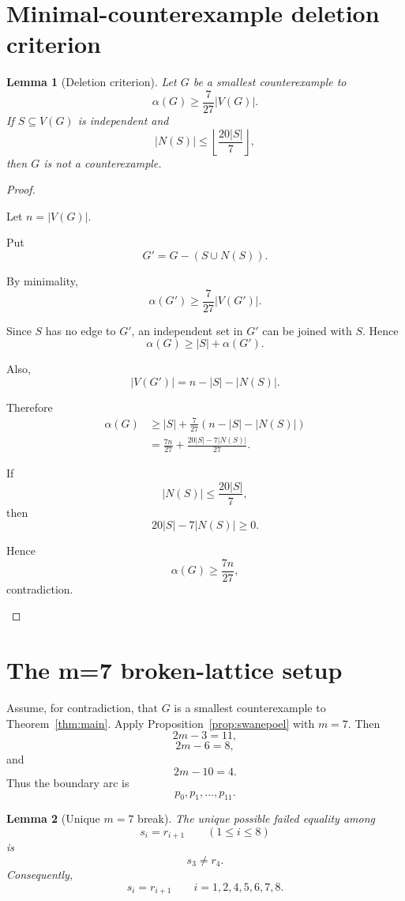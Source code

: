 \documentclass[11pt]{article}
\newtheorem{lemma}{Lemma}
\newcommand{\floor}[1]{\left\lfloor #1 \right\rfloor}
\begin{document}
\section{Minimal-counterexample deletion criterion}

\begin{lemma}[Deletion criterion]\label{lem:deletion}
Let $G$ be a smallest counterexample to
\[
  \alpha(G)\ge \frac{7}{27}|V(G)|.
\]
If $S\subseteq V(G)$ is independent and
\[
  |N(S)|\le \floor{\frac{20|S|}{7}},
\]
then $G$ is not a counterexample.
\end{lemma}

\begin{proof}
\begin{lamport}
\item Let $n=|V(G)|$.
\item Put
\[
  G'=G-(S\cup N(S)).
\]
\item By minimality,
\[
  \alpha(G')\ge \frac{7}{27}|V(G')|.
\]
\item Since $S$ has no edge to $G'$, an independent set in $G'$ can be joined with $S$. Hence
\[
  \alpha(G)\ge |S|+\alpha(G').
\]
\item Also,
\[
  |V(G')|=n-|S|-|N(S)|.
\]
\item Therefore
\[
\begin{aligned}
  \alpha(G)
  &\ge |S|+\frac{7}{27}(n-|S|-|N(S)|)\\
  &=\frac{7n}{27}+\frac{20|S|-7|N(S)|}{27}.
\end{aligned}
\]
\item If
\[
  |N(S)|\le \frac{20|S|}{7},
\]
then
\[
  20|S|-7|N(S)|\ge 0.
\]
\item Hence
\[
  \alpha(G)\ge \frac{7n}{27},
\]
contradiction.
\end{lamport}
\end{proof}

\section{The m=7 broken-lattice setup}

Assume, for contradiction, that $G$ is a smallest counterexample to Theorem~\ref{thm:main}.  Apply Proposition~\ref{prop:swanepoel} with $m=7$.  Then
\[
  2m-3=11,
\]
\[
  2m-6=8,
\]
and
\[
  2m-10=4.
\]
Thus the boundary arc is
\[
  p_0,p_1,\ldots,p_{11}.
\]

\begin{lemma}[Unique $m=7$ break]\label{lem:unique-break}
The unique possible failed equality among
\[
  s_i=r_{i+1}\qquad(1\le i\le 8)
\]
is
\[
  s_3\ne r_4.
\]
Consequently,
\[
  s_i=r_{i+1}\qquad i=1,2,4,5,6,7,8.
\]
\end{lemma}
\end{document}

